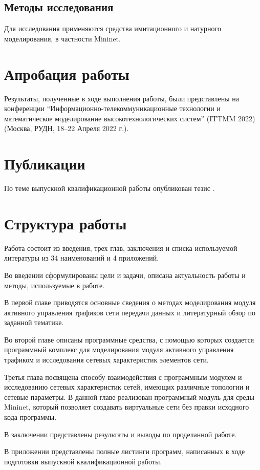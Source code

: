 \subsection*{Методы исследования}

Для исследования применяются средства имитационного и натурного
моделирования, в частности Mininet.


\section*{Апробация работы}

Результаты, полученные в ходе выполнения работы, были представлены на
конференции ``Информационно-телекоммуникационные технологии и
математическое моделирование высокотехнологических систем'' (ITTMM 2022)
(Москва, РУДН, 18--22 Апреля 2022 г.).


\section*{Публикации}

По теме выпускной квалификационной работы опубликован тезис
\cite{my-conf-work}.




\section*{Структура работы}


Работа состоит из введения, трех глав, заключения и списка используемой
литературы из 34 наименований и 4 приложений.

Во введении сформулированы цели и задачи, описана актуальность работы и
методы, используемые в работе.

В первой главе приводятся основные сведения о методах моделирования
модуля активного управления трафиков сети передачи данных и литературный
обзор по заданной тематике.

Во второй главе описаны программные средства, с помощью которых
создается программный комплекс для моделирования модуля активного
управления трафиком и исследования сетевых характеристик элементов сети.

Третья глава посвящена способу взаимодействия с программным модулем и
исследованию сетевых характеристик сетей, имеющих различные топологии и
сетевые параметры. В данной главе реализован программный модуль для
среды Mininet, который позволяет создавать виртуальные сети без правки
исходного кода программы.

В заключении представлены результаты и выводы по проделанной работе.

В приложении представлены полные листинги программ, написанных в ходе
подготовки выпускной квалификационной работы.


